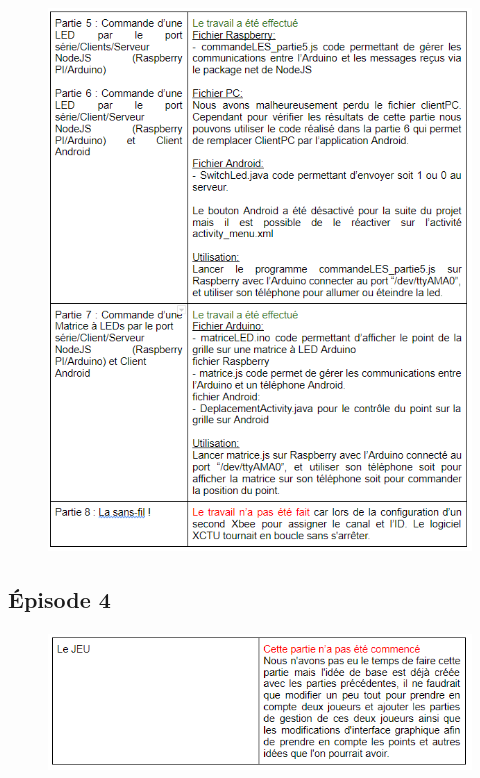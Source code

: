\documentclass[a4paper,12pt]{report}
\begin{document}
			\begin{figure}[H]
				\centering
					\includegraphics[scale=1]{images/ep3_3.png}
				\label{ep1}
			\end{figure}
		
		
		\subsection{Épisode 4}
			\paragraph*{}
			
			\begin{figure}[H]
				\centering
					\includegraphics[scale=1]{images/ep4.png}
				\label{ep1}
			\end{figure}
		
\end{document}
